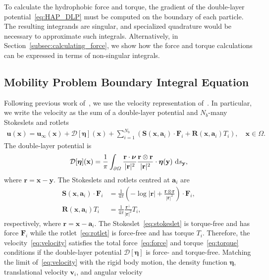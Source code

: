 \documentclass[lineno]{jfm}
\renewcommand{\aa}{\mathbf{a}}
\newcommand{\bd}{\partial}
\newcommand{\DD}{\mathcal{D}}
\newcommand{\eeta}{\boldsymbol{\eta}}
\newcommand{\FF}{\mathbf{F}}
\newcommand{\nnu}{\boldsymbol{\nu}}
\newcommand{\rr}{\mathbf{r}}
\newcommand{\RR}{\mathbf{R}}
\renewcommand{\SS}{\mathbf{S}}
\newcommand{\xx}{\mathbf{x}}
\newcommand{\uu}{\mathbf{u}}
\renewcommand{\vv}{\mathbf{v}}
\newcommand{\yy}{\mathbf{y}}
\begin{document}
To calculate the hydrophobic force and torque, the gradient of the
double-layer potential~\eqref{eq:HAP_DLP} must be computed on the
boundary of each particle. The resulting integrands are singular, and
specialized quadrature would be necessary to approximate such integrals.
Alternatively, in Section~\ref{subsec:calculating_force}, we show how
the force and torque calculations can be expressed in terms of
non-singular integrals.

\subsection{Mobility Problem Boundary Integral Equation}
Following previous work of~\cite{Lukas19}, we use the velocity
representation of~\cite{pow-mir1987}. In particular, we write the
velocity as the sum of a double-layer potential and $N_b$-many Stokeslets and
rotlets
\begin{align}
  \label{eq:velocity}
  \uu(\xx) = \uu_\infty(\xx) + \DD[\eeta](\xx) + 
    \sum_{i=1}^{N_b} \left(\SS(\xx,\aa_i) \cdot \FF_i + 
    \RR(\xx,\aa_i) T_i\right), \quad \xx \in \Omega.
\end{align}
The double-layer potential is
\begin{align}
  \DD[\eeta](\xx) = \frac{1}{\pi} \int_{\bd\Omega} 
    \frac{\rr \cdot \nnu}{|\rr|^2} \frac{\rr \otimes \rr}{|\rr|^2}
    \cdot \eeta(\yy) \, \dif s_\yy,
\end{align}
where $\rr = \xx - \yy$. The Stokeslets and rotlets centred at $\aa_i$
are
\begin{align}
\label{eq:stokeslet}
  \SS(\xx,\aa_i) \cdot \FF_i &= \frac{1}{4\pi} \left(-\log |\rr| + 
    \frac{\rr \otimes \rr}{|\rr|^2}\right) \cdot \FF_i, \\
    \label{eq:rotlet}
  \RR(\xx,\aa_i) T_i &= \frac{1}{4\pi} \frac{\rr^\perp}{|\rr|^2} T_i,
\end{align}
respectively, where $\rr = \xx - \aa_i$. The Stokeslet~\eqref{eq:stokeslet}  is torque-free
and has force $\FF_i$ while the rotlet~\eqref{eq:rotlet} is force-free and has torque
$T_i$. Therefore, the velocity~\eqref{eq:velocity} satisfies the total
force~\eqref{eq:force} and torque~\eqref{eq:torque} conditions if the
double-layer potential $\DD[\eeta]$ is force- and torque-free.  Matching
the limit of~\eqref{eq:velocity} with the rigid body motion, 
%
the density function $\eeta$, translational velocity $\vv_i$, and angular velocity
\end{document}
